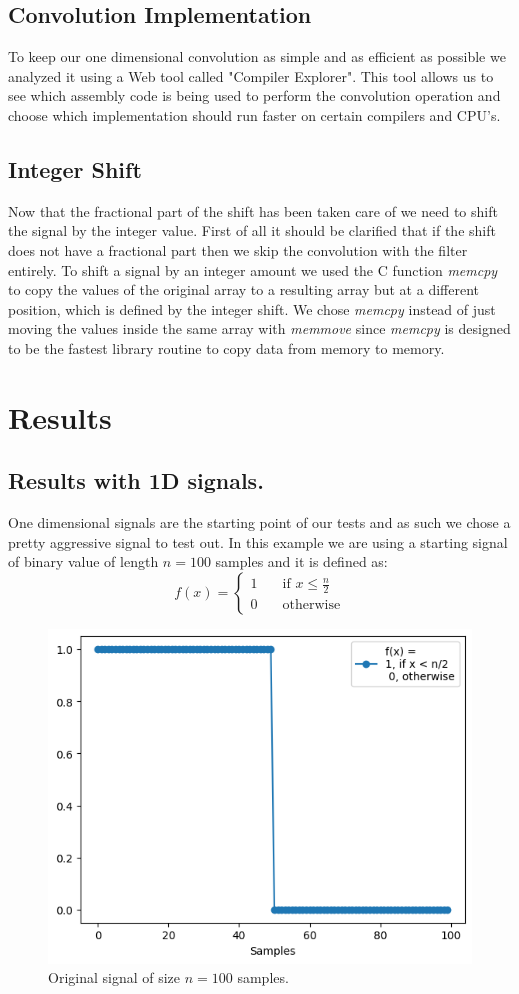 \documentclass[]{usiinfbachelorproject}
\begin{document}
		
		
		\subsection{Convolution Implementation}
		To keep our one dimensional convolution as simple and as efficient as possible we analyzed it using a Web tool called "Compiler Explorer"\cite{godbolt}. This tool allows us to see which assembly code is being used to perform the convolution operation and choose which implementation should run faster on certain compilers and CPU's.
		
		
		
		\subsection{Integer Shift}
		Now that the fractional part of the shift has been taken care of we need to shift the signal by the integer value.
		First of all it should be clarified that if the shift does not have a fractional part then we skip the convolution with the filter entirely.
		To shift a signal by an integer amount we used the C function \textsl{memcpy} to copy the values of the original array to a resulting array but at a different position, which is defined by the integer shift. We chose \textsl{memcpy} instead of just moving the values inside the same array with \textsl{memmove} since \textsl{memcpy} is designed to be the fastest library routine to copy data from memory to memory.
		
		\newpage
		\section{Results}
		\subsection{Results with 1D signals.}
		One dimensional signals are the starting point of our tests and as such we chose a pretty aggressive signal to test out. In this example we are using a starting signal of binary value of length $n=100$ samples and it is defined as:
		\begin{equation*}
			f(x) = 
			\begin{cases}
				1	& \quad \text{if } x \leq \frac{n}{2}\\
				0	& \quad \text{otherwise}
			\end{cases}
		\end{equation*}
		\begin{figure}[h]
			\centering
			\includegraphics[width=0.4\columnwidth]{images/original_signal.png}
			\caption{Original signal of size $n=100$ samples.}
			\label{original_signal}
		\end{figure}
		
\end{document}
